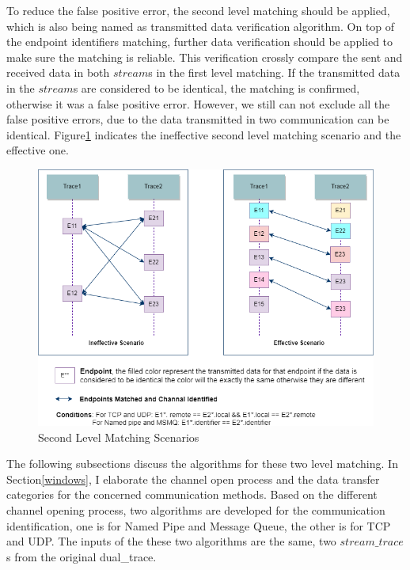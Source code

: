 To reduce the false positive error, the second level matching should be applied, which is also being named as transmitted data verification algorithm. On top of the endpoint identifiers matching, further data verification should be applied to make sure the matching is reliable. This verification crossly compare the sent and received data in both $stream$s in the first level matching. If the transmitted data in the $stream$s are considered to be identical, the matching is confirmed, otherwise it was a false positive error. However, we still can not exclude all the false positive errors, due to the data transmitted in two communication can be identical. Figure\ref{secondlevelmatching} indicates the ineffective second level matching scenario and the effective one.

\begin{figure}[H]
\centerline{\includegraphics[scale=0.55]{Figures/secondlevelmatching}}
 \caption{Second Level Matching Scenarios}
\label{secondlevelmatching}
\end{figure}


The following subsections discuss the algorithms for these two level matching. In Section\ref{windows}, I elaborate the channel open process and the data transfer categories for the concerned communication methods. Based on the different channel opening process, two algorithms are developed for the communication identification, one is for Named Pipe and Message Queue, the other is for TCP and UDP. The inputs of the these two algorithms are the same, two $stream\_trace$s from the original dual\_trace.

